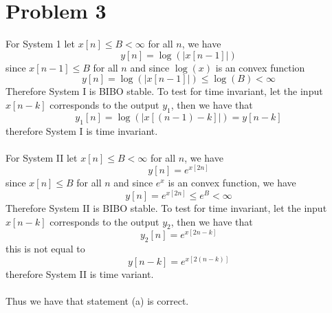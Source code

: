 \section*{Problem 3}
For System 1 let $x[n]\leq B <\infty$ for all $n$, we have
$$y[n]=\log(|x[n-1]|)$$
since $x[n-1]\leq B$ for all $n$ and since $\log(x)$ is an convex function
$$y[n]=\log(|x[n-1]|)\leq \log(B)<\infty$$
Therefore System I is BIBO stable. To test for time invariant, let 
the input $x[n-k]$ corresponds to the output $y_1$, then we have that
$$y_1[n]=\log(|x[(n-1)-k]|)=y[n-k]$$
therefore System I is time invariant.\\\\
For System II let $x[n]\leq B <\infty$ for all $n$, we have
$$y[n]=e^{x[2n]}$$
since $x[n]\leq B$ for all $n$ and since $e^x$ is an convex function, we have
$$y[n]=e^{x[2n]}\leq e^B<\infty$$
Therefore System II is BIBO stable. To test for time invariant, let
the input $x[n-k]$ corresponds to the output $y_2$, then we have that
$$y_2[n]=e^{x[2n-k]}$$
this is not equal to 
$$y[n-k]=e^{x[2(n-k)]}$$
therefore System II is time variant.\\\\
Thus we have that statement (a) is correct.


